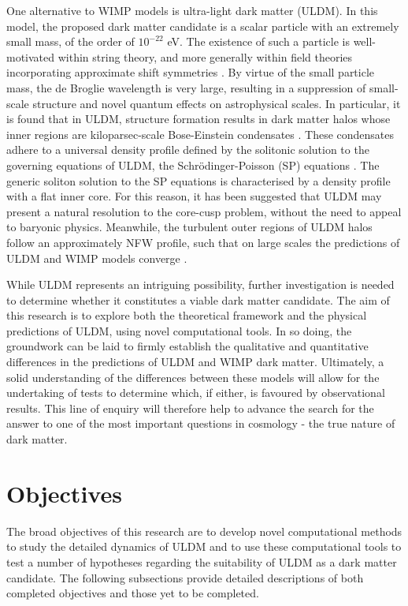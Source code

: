 One alternative to WIMP models is ultra-light dark matter (ULDM). In this model, the proposed dark matter candidate is a scalar particle with an extremely small mass, of the order of $10^{-22}$ eV. The existence of such a particle is well-motivated within string theory, and more generally within field theories incorporating approximate shift symmetries \cite{Hui:2016ltb}. By virtue of the small particle mass, the de Broglie wavelength is very large, resulting in a suppression of small-scale structure and novel quantum effects on astrophysical scales. In particular, it is found that in ULDM, structure formation results in dark matter halos whose inner regions are kiloparsec-scale Bose-Einstein condensates \cite{Veltmaat:2018dfz}. These condensates adhere to a universal density profile defined by the solitonic solution to the governing equations of ULDM, the Schr{\"o}dinger-Poisson (SP) equations \cite{Marsh:2015xka}. The generic soliton solution to the SP equations is characterised by a density profile with a flat inner core. For this reason, it has been suggested that ULDM may present a natural resolution to the core-cusp problem, without the need to appeal to baryonic physics. Meanwhile, the turbulent outer regions of ULDM halos follow an approximately NFW profile, such that on large scales the predictions of ULDM and WIMP models converge \cite{Du:2016zcv}.

While ULDM represents an intriguing possibility, further investigation is needed to determine whether it constitutes a viable dark matter candidate. The aim of this research is to explore both the theoretical framework and the physical predictions of ULDM, using novel computational tools. In so doing, the groundwork can be laid to firmly establish the qualitative and quantitative differences in the predictions of ULDM and WIMP dark matter. Ultimately, a solid understanding of the differences between these models will allow for the undertaking of tests to determine which, if either, is favoured by observational results. This line of enquiry will therefore help to advance the search for the answer to one of the most important questions in cosmology - the true nature of dark matter. 


\section{Objectives}

The broad objectives of this research are to develop novel computational methods to study the detailed dynamics of ULDM and to use these computational tools to test a number of hypotheses regarding the suitability of ULDM as a dark matter candidate. The following subsections provide detailed descriptions of both completed objectives and those yet to be completed. 

